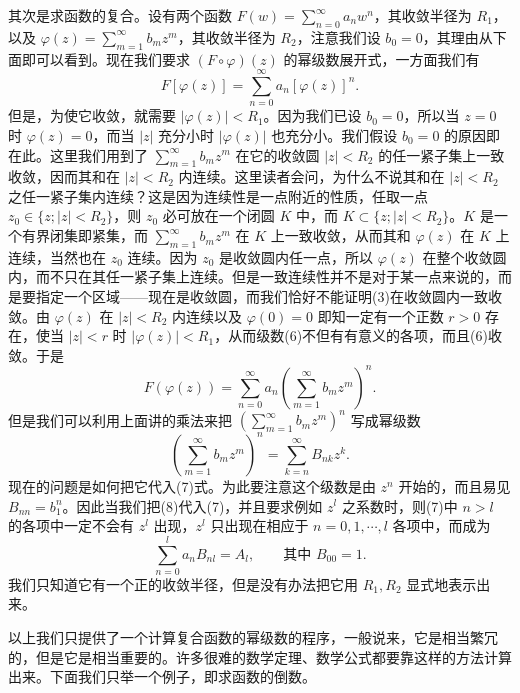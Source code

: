 其次是求函数的复合。设有两个函数 $F(w)=\sum_{n=0}^{\infty}a_nw^n$，其收敛半径为 $R_1$，以及 $\varphi(z)=\sum_{m=1}^{\infty}b_mz^m$，其收敛半径为 $R_2$，注意我们设 $b_0=0$，其理由从下面即可以看到。现在我们要求 $(F\circ\varphi)(z)$ 的幂级数展开式，一方面我们有
\begin{equation}
 F[\varphi(z)]=\sum_{n=0}^{\infty}a_n[\varphi(z)]^n.
 \tag{6}
\end{equation}
但是，为使它收敛，就需要 $|\varphi(z)|<R_1$。因为我们已设 $b_0=0$，所以当 $z=0$ 时 $\varphi(z)=0$，而当 $|z|$ 充分小时 $|\varphi(z)|$ 也充分小。我们假设 $b_0=0$ 的原因即在此。这里我们用到了 $\sum_{m=1}^{\infty}b_mz^m$ 在它的收敛圆 $|z|<R_2$ 的任一紧子集上一致收敛，因而其和在 $|z|<R_2$ 内连续。这里读者会问，为什么不说其和在 $|z|<R_2$ 之任一紧子集内连续？这是因为连续性是一点附近的性质，任取一点 $z_0\in\{z;|z|<R_2\}$，则 $z_0$ 必可放在一个闭圆 $K$ 中，而 $K\subset\{z;|z|<R_2\}$。$K$ 是一个有界闭集即紧集，而 $\sum_{m=1}^{\infty}b_mz^m$ 在 $K$ 上一致收敛，从而其和 $\varphi(z)$ 在 $K$ 上连续，当然也在 $z_0$ 连续。因为 $z_0$ 是收敛圆内任一点，所以 $\varphi(z)$ 在整个收敛圆内，而不只在其任一紧子集上连续。但是一致连续性并不是对于某一点来说的，而是要指定一个区域——现在是收敛圆，而我们恰好不能证明(3)在收敛圆内一致收敛。由 $\varphi(z)$ 在 $|z|<R_2$ 内连续以及 $\varphi(0)=0$ 即知一定有一个正数 $r>0$ 存在，使当 $|z|<r$ 时 $|\varphi(z)|<R_1$，从而级数(6)不但有有意义的各项，而且(6)收敛。于是
\begin{equation}
 F(\varphi(z))=\sum_{n=0}^{\infty}a_n\left(\sum_{m=1}^{\infty}b_mz^m\right)^n.
 \tag{7}
\end{equation}
但是我们可以利用上面讲的乘法来把 $\left(\sum_{m=1}^{\infty}b_mz^m\right)^n$ 写成幂级数
\begin{equation}
 \left(\sum_{m=1}^{\infty}b_mz^m\right)^n=\sum_{k=n}^{\infty}B_{nk}z^k.
 \tag{8}
\end{equation}
现在的问题是如何把它代入(7)式。为此要注意这个级数是由 $z^n$ 开始的，而且易见 $B_{nn}=b_1^n$。因此当我们把(8)代入(7)，并且要求例如 $z^l$ 之系数时，则(7)中 $n>l$ 的各项中一定不会有 $z^l$ 出现，$z^l$ 只出现在相应于 $n=0,1,\cdots,l$ 各项中，而成为
\[
 \sum_{n=0}^l a_nB_{nl}=A_l,\qquad\text{其中 }B_{00}=1.
\]
我们只知道它有一个正的收敛半径，但是没有办法把它用 $R_1,R_2$ 显式地表示出来。

以上我们只提供了一个计算复合函数的幂级数的程序，一般说来，它是相当繁冗的，但是它是相当重要的。许多很难的数学定理、数学公式都要靠这样的方法计算出来。下面我们只举一个例子，即求函数的倒数。

